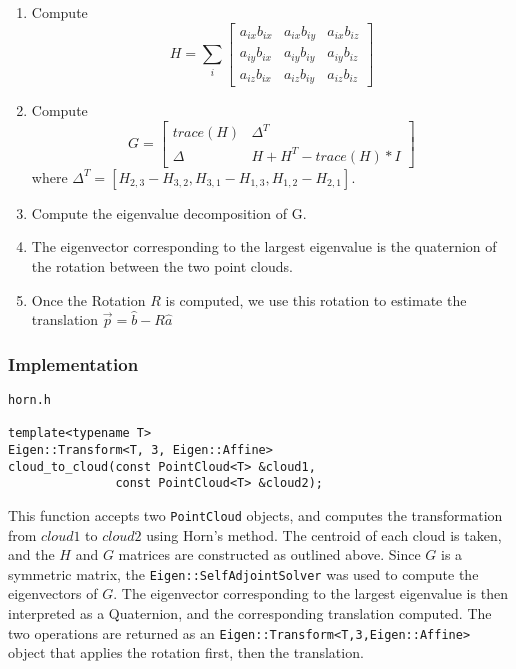 \documentclass[letterpaper, 11pt]{report}
\begin{document}
\begin{enumerate}
\item Compute
$$H = \sum_i{\begin{bmatrix}
                a_{ix}b_{ix} & a_{ix}b_{iy} & a_{ix}b_{iz} \\
                a_{iy}b_{ix} & a_{iy}b_{iy} & a_{iy}b_{iz} \\
                a_{iz}b_{ix} & a_{iz}b_{iy} & a_{iz}b_{iz}
             \end{bmatrix}}$$
             
\item Compute
$$G = \begin{bmatrix}
        trace(H) & \Delta^T \\
        \Delta & H + H^T - trace(H)*I
       \end{bmatrix} $$
       where $\Delta^T = [H_{2,3} - H_{3,2}, H_{3,1} - H_{1,3}, H_{1,2} - H_{2,1}]$.
 \item Compute the eigenvalue decomposition of G.
 \item The eigenvector corresponding to the largest eigenvalue is the quaternion of the rotation between the two point clouds.
 \item Once the Rotation $R$ is computed, we use this rotation to estimate the translation $\vec p = \hat{b} - R\hat{a}$
\end{enumerate}

\subsubsection{Implementation}
\begin{verbatim}
horn.h

template<typename T>
Eigen::Transform<T, 3, Eigen::Affine>
cloud_to_cloud(const PointCloud<T> &cloud1,
               const PointCloud<T> &cloud2);
\end{verbatim}
This function accepts two \texttt{PointCloud} objects, and computes the transformation from $cloud1$ to $cloud2$ using Horn's method. The centroid of each cloud is taken, and the $H$ and $G$ matrices are constructed as outlined above. Since $G$ is a symmetric matrix, the \texttt{Eigen::SelfAdjointSolver} was used to compute the eigenvectors of $G$. The eigenvector corresponding to the largest eigenvalue is then interpreted as a Quaternion, and the corresponding translation computed. The two operations are returned as an \texttt{Eigen::Transform<T,3,Eigen::Affine>} object that applies the rotation first, then the translation.
\end{document}
